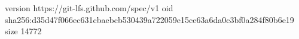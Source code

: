 version https://git-lfs.github.com/spec/v1
oid sha256:d35d47f066ec631cbaebcb530439a722059e15ce63a6da0c3bf0a284f80b6e19
size 14772
